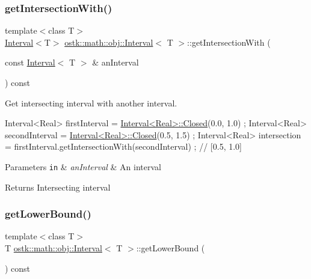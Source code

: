 \subsubsection{\texorpdfstring{get\+Intersection\+With()}{getIntersectionWith()}}
{\footnotesize\ttfamily template$<$class T$>$ \\
\hyperlink{classostk_1_1math_1_1obj_1_1_interval}{Interval}$<$T$>$ \hyperlink{classostk_1_1math_1_1obj_1_1_interval}{ostk\+::math\+::obj\+::\+Interval}$<$ T $>$\+::get\+Intersection\+With (\begin{DoxyParamCaption}\item[{const \hyperlink{classostk_1_1math_1_1obj_1_1_interval}{Interval}$<$ T $>$ \&}]{an\+Interval }\end{DoxyParamCaption}) const}



Get intersecting interval with another interval. 


\begin{DoxyCode}
Interval<Real> firstInterval = \hyperlink{classostk_1_1math_1_1obj_1_1_interval_a48e9f436e8994c49026a1ecd503bc190}{Interval<Real>::Closed}(0.0, 1.0) ;
Interval<Real> secondInterval = \hyperlink{classostk_1_1math_1_1obj_1_1_interval_a48e9f436e8994c49026a1ecd503bc190}{Interval<Real>::Closed}(0.5, 1.5) ;
Interval<Real> intersection = firstInterval.getIntersectionWith(secondInterval) ; \textcolor{comment}{// [0.5, 1.0]}
\end{DoxyCode}



\begin{DoxyParams}[1]{Parameters}
\mbox{\tt in}  & {\em an\+Interval} & An interval \\
\hline
\end{DoxyParams}
\begin{DoxyReturn}{Returns}
Intersecting interval 
\end{DoxyReturn}
\mbox{\label{classostk_1_1math_1_1obj_1_1_interval_ab6b044772238c2f66072377e4e6f7f25}} 
\subsubsection{\texorpdfstring{get\+Lower\+Bound()}{getLowerBound()}}
{\footnotesize\ttfamily template$<$class T$>$ \\
T \hyperlink{classostk_1_1math_1_1obj_1_1_interval}{ostk\+::math\+::obj\+::\+Interval}$<$ T $>$\+::get\+Lower\+Bound (\begin{DoxyParamCaption}{ }\end{DoxyParamCaption}) const}



